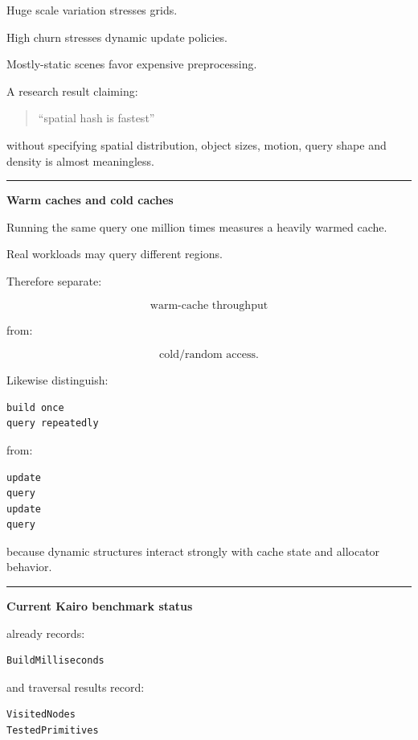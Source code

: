 Huge scale variation stresses grids.

High churn stresses dynamic update policies.

Mostly-static scenes favor expensive preprocessing.

A research result claiming:

\begin{quote}
``spatial hash is fastest''
\end{quote}

without specifying spatial distribution, object sizes, motion, query shape and density is almost meaningless.

\begin{center}\rule{0.5\linewidth}{0.5pt}\end{center}

\textbf{Warm caches and cold caches}

Running the same query one million times measures a heavily warmed cache.

Real workloads may query different regions.

Therefore separate:

\[
\text{warm-cache throughput}
\]

from:

\[
\text{cold/random access}.
\]

Likewise distinguish:

\begin{verbatim}
build once
query repeatedly
\end{verbatim}

from:

\begin{verbatim}
update
query
update
query
\end{verbatim}

because dynamic structures interact strongly with cache state and allocator behavior.

\begin{center}\rule{0.5\linewidth}{0.5pt}\end{center}

\textbf{Current Kairo benchmark status}

 already records:

\begin{verbatim}
BuildMilliseconds
\end{verbatim}

and traversal results record:

\begin{verbatim}
VisitedNodes
TestedPrimitives
\end{verbatim}

